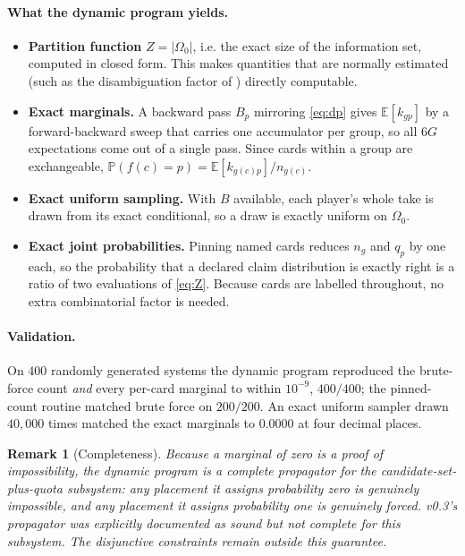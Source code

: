 \documentclass[11pt,letterpaper]{article}
\newtheorem{remark}{Remark}
\newcommand{\Prob}{\ensuremath{\mathbb{P}}}
\newcommand{\Ex}{\ensuremath{\mathbb{E}}}
\begin{document}
\paragraph{What the dynamic program yields.}
\begin{itemize}
\item \textbf{Partition function} $Z = |\Omega_0|$, i.e. the exact size of the
information set, computed in closed form. This makes quantities that are
normally estimated (such as the disambiguation factor of
\citealp{long2010understanding}) directly computable.
\item \textbf{Exact marginals.} A backward pass $B_p$ mirroring \eqref{eq:dp}
gives $\Ex[k_{gp}]$ by a forward-backward sweep that carries one accumulator
per group, so all $6G$ expectations come out of a single pass. Since cards
within a group are exchangeable,
$\Prob(f(c) = p) = \Ex[k_{g(c)p}] / n_{g(c)}$.
\item \textbf{Exact uniform sampling.} With $B$ available, each player's whole
take is drawn from its exact conditional, so a draw is exactly uniform on
$\Omega_0$.
\item \textbf{Exact joint probabilities.} Pinning named cards reduces $n_g$ and
$q_p$ by one each, so the probability that a declared claim distribution is
exactly right is a ratio of two evaluations of \eqref{eq:Z}. Because cards are
labelled throughout, no extra combinatorial factor is needed.
\end{itemize}

\paragraph{Validation.} On $400$ randomly generated systems the dynamic program
reproduced the brute-force count \emph{and} every per-card marginal to within
$10^{-9}$, $400/400$; the pinned-count routine matched brute force on $200/200$.
An exact uniform sampler drawn $40{,}000$ times matched the exact marginals to
$0.0000$ at four decimal places.

\begin{remark}[Completeness]
Because a marginal of zero is a proof of impossibility, the dynamic program is
a \emph{complete} propagator for the candidate-set-plus-quota subsystem: any
placement it assigns probability zero is genuinely impossible, and any
placement it assigns probability one is genuinely forced. v0.3's propagator was
explicitly documented as sound but not complete for this subsystem. The
disjunctive constraints remain outside this guarantee.
\end{remark}
\end{document}
